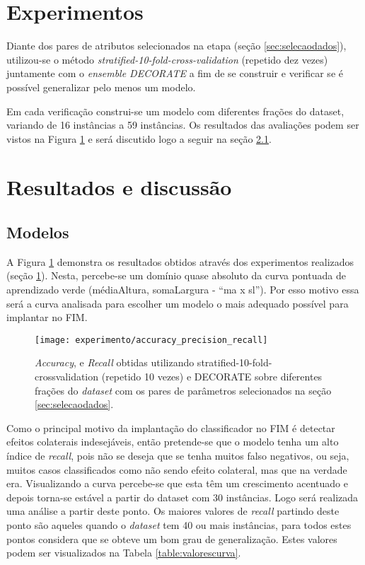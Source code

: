 \section{Experimentos}
\label{sec:constvalidacao}
Diante dos pares de atributos selecionados na etapa (seção \ref{sec:selecaodados}), utilizou-se o método \textit{stratified-10-fold-cross-validation} (repetido dez vezes) juntamente com o \textit{ensemble DECORATE} a fim de se construir e verificar se é possível generalizar pelo menos um modelo.

Em cada verificação construi-se um modelo com diferentes frações do dataset, variando de 16 instâncias a 59 instâncias. Os resultados das avaliações podem ser vistos na Figura \ref{fig:accuracy_precision_recall} e será discutido logo a seguir na seção \ref{subsec:discumodelos}.

\section{Resultados e discussão}
\subsection{Modelos}
\label{subsec:discumodelos}
A Figura \ref{fig:accuracy_precision_recall} demonstra os resultados obtidos
através dos experimentos realizados (seção \ref{sec:constvalidacao}). Nesta, percebe-se um domínio quase absoluto da curva pontuada de aprendizado verde (médiaAltura, somaLargura - ``ma x sl''). Por esso motivo essa será a curva analisada para escolher um modelo o mais adequado possível para implantar no FIM.

\begin{figure}[!h] \centering 
  \centering
  \texttt{[image: experimento/accuracy\_precision\_recall]} 
  \caption{\textit{Accuracy},  e \textit{Recall} obtidas utilizando stratified-10-fold-crossvalidation (repetido 10 vezes) e DECORATE sobre diferentes frações do \textit{dataset} com os pares de parâmetros  selecionados na seção \ref{sec:selecaodados}.} 
  \label{fig:accuracy_precision_recall}
\end{figure}

Como o principal motivo da implantação do classificador no FIM é detectar efeitos colaterais indesejáveis, então pretende-se que o modelo tenha um alto índice de \textit{recall}, pois não se deseja que se tenha muitos falso negativos, ou seja, muitos casos classificados como não sendo efeito colateral, mas que na verdade era. Visualizando a curva percebe-se que esta têm um crescimento acentuado e depois torna-se estável a partir do dataset com 30 instâncias. Logo será realizada uma análise a partir deste ponto. Os maiores valores de \textit{recall} partindo deste ponto são aqueles quando o \textit{dataset} tem 40 ou mais instâncias, para todos estes pontos considera que se obteve um bom grau de generalização. Estes valores podem ser visualizados na Tabela \ref{table:valorescurva}. 

